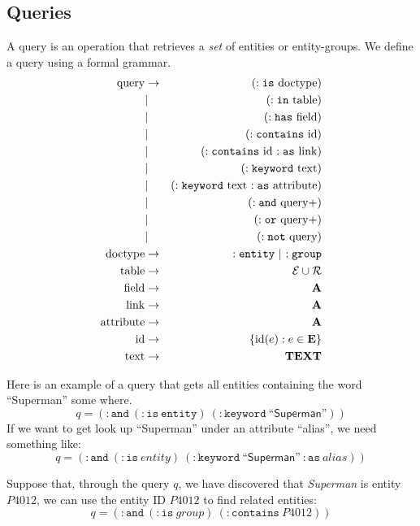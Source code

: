 \documentclass{article}
\begin{document}
\subsection{Queries}
\label{sec:query}
A query is an operation that retrieves a {\em set} of entities or entity-groups.
We define a query using a formal grammar.
\begin{eqnarray*}
\mathrm{query} 
  &\rightarrow& (\mathtt{:is}\ \mathrm{doctype}) \\
  &|& (\mathtt{:in}\ \mathrm{table}) \\
  &|& (\mathtt{:has}\ \mathrm{field}) \\
  &|& (\mathtt{:contains}\ \mathrm{id}) \\
  &|& (\mathtt{:contains}\ \mathrm{id}\ \mathtt{:as}\ \mathrm{link}) \\
  &|& (\mathtt{:keyword}\ \mathrm{text})\\
  &|& (\mathtt{:keyword}\ \mathrm{text}\ \mathtt{:as}\ \mathrm{attribute})\\
  &|& (\mathtt{:and}\ \mathrm{query}+) \\
  &|& (\mathtt{:or}\ \mathrm{query}+) \\
  &|& (\mathtt{:not}\ \mathrm{query})\\
\mathrm{doctype}
  &\rightarrow& \mathtt{:entity}\ |\ \mathtt{:group} \\
\mathrm{table} &\rightarrow& \mathcal{E}\cup\mathcal{R} \\
\mathrm{field} &\rightarrow& \mathbf{A} \\
\mathrm{link} &\rightarrow& \mathbf{A} \\
\mathrm{attribute} &\rightarrow& \mathbf{A} \\
\mathrm{id} &\rightarrow& \{\mathrm{id}(e) : e\in\mathbf{E}\} \\
\mathrm{text} &\rightarrow& \TEXT \\
\end{eqnarray*}

Here is an example of a query that gets all entities containing the word
``Superman'' some where.
$$q = 
  (\mathtt{:and}\ (\mathtt{:is}\ \mathtt{entity})
    \ (\mathtt{:keyword}\ \textsf{``Superman''})) $$
If we want to get look up ``Superman'' under an attribute ``alias'', we need
something like:
$$q = 
  (\mathtt{:and}\ (\mathtt{:is}\ \textit{entity})
    \ (\mathtt{:keyword}\ \textsf{``Superman''}\ 
        \mathtt{:as}\ \textit{alias})) $$

Suppose that, through the query $q$, we have discovered that \textit{Superman}
is entity $P4012$, we can use the entity ID $P4012$ to find related entities:
$$q = 
  (\mathtt{:and}
   \ (\mathtt{:is}\ \textit{group})
   \ (\mathtt{:contains}\ P4012)) $$
\end{document}
